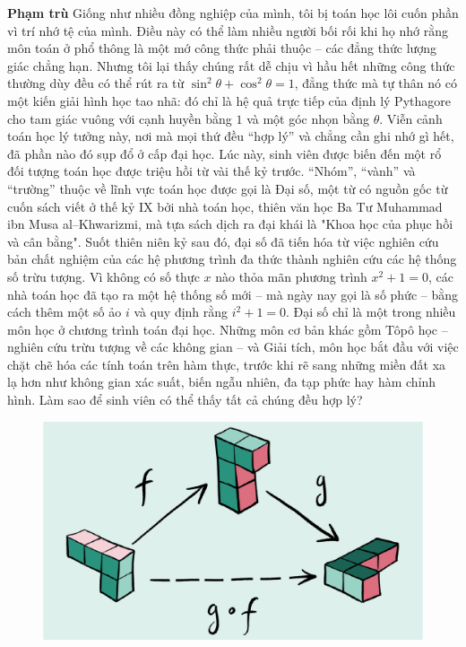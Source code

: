 \begin{multicols}{2}
	\vskip 0.1cm
	\textbf{\color{duongvaotoanhoc}Phạm trù}
	\vskip 0.1cm
	Giống như nhiều đồng nghiệp của mình, tôi bị toán học lôi cuốn phần vì trí nhớ tệ của mình. Điều này có thể làm nhiều người bối rối khi họ nhớ rằng môn toán ở phổ thông là một mớ công thức phải thuộc -- các đẳng thức lượng giác chẳng hạn. Nhưng tôi lại thấy chúng rất dễ chịu vì hầu hết những công thức thường dùy đều có thể rút ra từ $\sin^2 \theta + \cos^2 \theta = 1$, đẳng thức mà tự thân nó có một kiến giải hình học tao nhã: đó chỉ là hệ quả trực tiếp của định lý Pythagore cho tam giác vuông với cạnh huyền bằng $1$ và một góc nhọn bằng $\theta$.
	\vskip 0.1cm
	Viễn cảnh toán học lý tưởng này, nơi mà mọi thứ đều ``hợp lý'' và chẳng cần ghi nhớ gì hết, đã phần nào đó sụp đổ ở cấp đại học. Lúc này, sinh viên được biến đến một rổ đối tượng toán học được triệu hồi từ vài thế kỷ trước. ``Nhóm'', ``vành'' và ``trường'' thuộc về lĩnh vực toán học được gọi là Đại số, một từ có nguồn gốc từ cuốn sách viết ở thế kỷ IX bởi nhà toán học, thiên văn học Ba Tư Muhammad ibn Musa al--Khwarizmi, mà tựa sách dịch ra đại khái là "Khoa học của phục hồi và cân bằng". Suốt thiên niên kỷ sau đó, đại số đã tiến hóa từ việc nghiên cứu bản chất nghiệm của các hệ phương trình đa thức thành nghiên cứu các hệ thống số trừu tượng. Vì không có số thực $x$ nào thỏa mãn phương trình $x^2+1 = 0$, các nhà toán học đã tạo ra một hệ thống số mới -- mà ngày nay gọi là số phức -- bằng cách thêm một số ảo $i$ và quy định rằng $i^2+1 = 0$.
	\vskip 0.1cm
	Đại số chỉ là một trong nhiều môn học ở chương trình toán đại học. Những môn cơ bản khác gồm Tôpô học -- nghiên cứu trừu tượng về các không gian -- và Giải tích, môn học bắt đầu với việc chặt chẽ hóa các tính toán trên hàm thực, trước khi rẽ sang những miền đất xa lạ hơn như không gian xác suất, biến ngẫu nhiên, đa tạp phức hay hàm chỉnh hình. Làm sao để sinh viên có thể thấy tất cả chúng đều hợp lý?
	\begin{figure}[H]
		\centering
		\vspace*{-5pt}
		\captionsetup{labelformat= empty, justification=centering}
		\includegraphics[width=1\linewidth]{3}

\end{figure}
\end{multicols}
